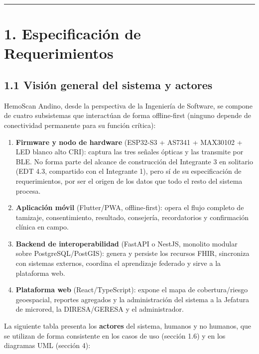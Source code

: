 \documentclass[11pt,a4paper]{article}
\providecommand{\tightlist}{%
  \setlength{\itemsep}{0pt}\setlength{\parskip}{0pt}}
\begin{document}
\begin{center}\rule{0.5\linewidth}{0.5pt}\end{center}

\section{1. Especificación de Requerimientos}\label{especificaciuxf3n-de-requerimientos}

\subsection{1.1 Visión general del sistema y actores}\label{visiuxf3n-general-del-sistema-y-actores}

HemoScan Andino, desde la perspectiva de la Ingeniería de Software, se compone de cuatro subsistemas que interactúan de forma offline-first (ninguno depende de conectividad permanente para su función crítica):

\begin{enumerate}
\def\labelenumi{\arabic{enumi}.}
\tightlist
\item
  \textbf{Firmware y nodo de hardware} (ESP32-S3 + AS7341 + MAX30102 + LED blanco alto CRI): captura las tres señales ópticas y las transmite por BLE. No forma parte del alcance de construcción del Integrante 3 en solitario (EDT 4.3, compartido con el Integrante 1), pero sí de su especificación de requerimientos, por ser el origen de los datos que todo el resto del sistema procesa.
\item
  \textbf{Aplicación móvil} (Flutter/PWA, offline-first): opera el flujo completo de tamizaje, consentimiento, resultado, consejería, recordatorios y confirmación clínica en campo.
\item
  \textbf{Backend de interoperabilidad} (FastAPI o NestJS, monolito modular sobre PostgreSQL/PostGIS): genera y persiste los recursos FHIR, sincroniza con sistemas externos, coordina el aprendizaje federado y sirve a la plataforma web.
\item
  \textbf{Plataforma web} (React/TypeScript): expone el mapa de cobertura/riesgo geoespacial, reportes agregados y la administración del sistema a la Jefatura de microred, la DIRESA/GERESA y el administrador.
\end{enumerate}

La siguiente tabla presenta los \textbf{actores} del sistema, humanos y no humanos, que se utilizan de forma consistente en los casos de uso (sección 1.6) y en los diagramas UML (sección 4):
\end{document}
